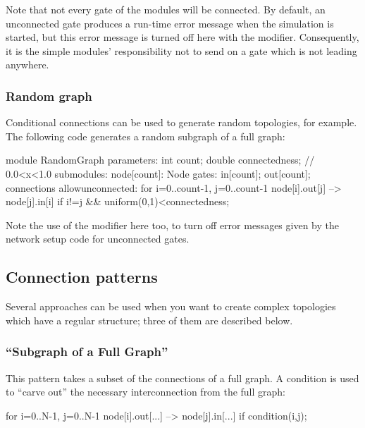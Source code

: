 Note that not every gate of the modules will be connected. By default,
an unconnected gate produces a run-time error message when the
simulation is started, but this error message is turned off here with
the  modifier.
Consequently, it is the simple modules' responsibility not to send
on a gate which is not leading anywhere.



\subsubsection{Random graph}

Conditional connections can be used to generate random
topologies, for example. The following code
generates a random subgraph of a full graph:

\begin{ned}
module RandomGraph {
    parameters:
        int count;
        double connectedness; // 0.0<x<1.0
    submodules:
        node[count]: Node {
            gates:
                in[count];
                out[count];
        }
    connections allowunconnected:
        for i=0..count-1, j=0..count-1 {
            node[i].out[j] --> node[j].in[i]
                if i!=j && uniform(0,1)<connectedness;
        }
}
\end{ned}

Note the use of the  modifier
here too, to turn off error messages given by the network setup code
for unconnected gates.


\subsection{Connection patterns}


Several approaches can be used when you want to create complex
topologies which have a regular structure; three of them are
described below.


\subsubsection{``Subgraph of a Full Graph''}


This pattern takes a subset of the connections of a full graph.  A
condition is used to ``carve out'' the necessary interconnection from
the full graph:

\begin{ned}
for i=0..N-1, j=0..N-1 {
    node[i].out[...] --> node[j].in[...] if condition(i,j);
}
\end{ned}

